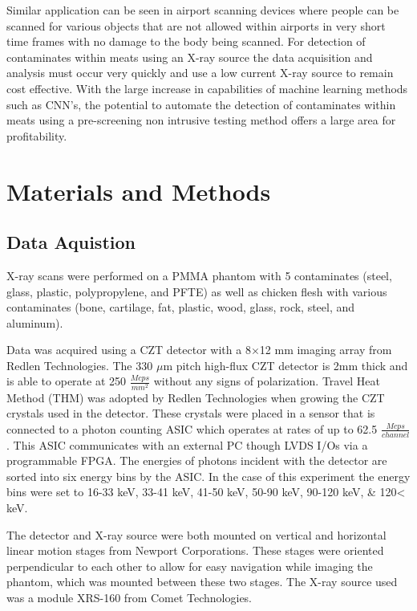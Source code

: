 \documentclass[a4paper,11pt]{article}
\begin{document}
Similar application can be seen in airport scanning devices where people can be scanned for various objects that are not allowed within airports in very short time frames with no damage to the body being scanned. For detection of contaminates within meats using an X-ray source the data acquisition and analysis must occur very quickly and use a low current X-ray source to remain cost effective. With the large increase in capabilities of machine learning methods such as CNN's, the potential to automate the detection of contaminates within meats using a pre-screening non intrusive testing method offers a large area for profitability. 





\section{Materials and Methods}
\label{sec:methods}

\subsection{Data Aquistion}
X-ray scans were performed on a PMMA phantom with 5 contaminates (steel, glass, plastic, polypropylene, and PFTE) as well as chicken flesh with various contaminates (bone, cartilage, fat, plastic, wood, glass, rock, steel, and aluminum).

Data was acquired using a CZT detector with a 8$\times$12 mm imaging array from Redlen Technologies. The 330 $\mu$m pitch high-flux CZT detector is 2mm thick and is able to operate at 250 $\frac{Mcps}{mm^2}$ without any signs of polarization. Travel Heat Method (THM) was adopted by Redlen Technologies when growing the CZT crystals used in the detector. These crystals were placed in a sensor that is connected to a photon counting ASIC which operates at rates of up to 62.5 $\frac{Mcps}{channel}$. This ASIC communicates with an external PC though LVDS I/Os via a programmable FPGA. The energies of photons incident with the detector are sorted into six energy bins by the ASIC. In the case of this experiment the energy bins were set to 16-33 keV, 33-41 keV, 41-50 keV, 50-90 keV, 90-120 keV, \& 120< keV.

The detector and X-ray source were both mounted on vertical and horizontal linear motion stages from Newport Corporations. These stages were oriented perpendicular to each other to allow for easy navigation while imaging the phantom, which was mounted between these two stages. The X-ray source used was a module XRS-160 from Comet Technologies. 
\end{document}
